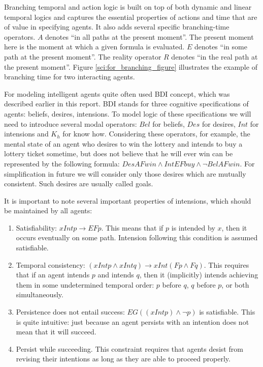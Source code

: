 Branching temporal and action logic is built on top of both dynamic and linear temporal logics and captures the essential properties of actions and time that are of value in specifying agents. It also adds several specific branching-time operators. $A$ denotes ``in all paths at the present moment''. The present moment here is the moment at which a given formula is evaluated. $E$ denotes ``in some path at the present moment''. The reality operator $R$ denotes ``in the real path at the present moment''. Figure \ref{sci:for_branching_figure} illustrates the example of branching time for two interacting agents.

For modeling intelligent agents quite often used BDI concept, which was described earlier in this report. BDI stands for three cognitive specifications of agents: beliefs, desires, intensions. To model logic of these specifications we will need to introduce several modal operators: $Bel$ for beliefs, $Des$ for desires, $Int$ for intensions and $K_h$ for know how. Considering these operators, for example, the mental state of an agent who desires to win the lottery and intends to buy a lottery ticket sometime, but does not believe that he will ever win can be represented by the following formula: $DesAFwin \land IntEFbuy \land \neg BelAFwin$. For simplification in future we will consider only those desires which are mutually consistent. Such desires are usually called goals.

It is important to note several important properties of intensions, which should be maintained by all agents\cite{Singh_92}:
\begin{enumerate}
  \item Satisfiability: $xIntp\rightarrow EFp$. This means that if $p$ is intended by $x$, then it occurs eventually on some path. Intension following this condition is assumed satisfiable.
  \item Temporal consistency: $(xIntp \land xIntq)\rightarrow xInt(Fp \land Fq)$. This requires that if an agent intends $p$ and intends $q$, then it  (implicitly) intends achieving them in some undetermined temporal order: $p$ before $q$, $q$ before $p$, or both simultaneously.
  \item Persistence does not entail success: $EG((xIntp) \land \neg p)$ is satisfiable. This is quite intuitive: just because an agent persists with an intention does not mean that it will succeed.
  \item Persist while succeeding. This constraint requires that agents desist from revising their intentions as long as they are able to proceed properly.
\end{enumerate}

